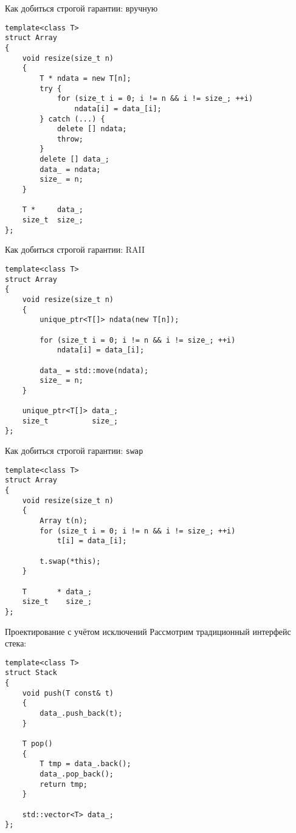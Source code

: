 \documentclass{beamer}
\begin{document}
\begin{frame}[fragile]{Как добиться строгой гарантии: вручную}
    \begin{lstlisting}
template<class T> 
struct Array 
{
    void resize(size_t n) 
    {
        T * ndata = new T[n];
        try { 
            for (size_t i = 0; i != n && i != size_; ++i)
                ndata[i] = data_[i];
        } catch (...) { 
            delete [] ndata;
            throw;
        }
        delete [] data_;
        data_ = ndata;
        size_ = n;    
    }
    
    T *     data_;
    size_t  size_;
};
    \end{lstlisting}
\end{frame}

\begin{frame}[fragile]{Как добиться строгой гарантии: RAII}
\begin{lstlisting}
template<class T>
struct Array 
{
    void resize(size_t n) 
    {
        unique_ptr<T[]> ndata(new T[n]);

        for (size_t i = 0; i != n && i != size_; ++i)
            ndata[i] = data_[i];

        data_ = std::move(ndata);
        size_ = n;    
    }

    unique_ptr<T[]> data_;
    size_t          size_;
};
\end{lstlisting}
\end{frame}

\begin{frame}[fragile]{Как добиться строгой гарантии: \texttt{swap}}
\begin{lstlisting}
template<class T>
struct Array 
{
    void resize(size_t n) 
    {
        Array t(n);
        for (size_t i = 0; i != n && i != size_; ++i)
            t[i] = data_[i];

        t.swap(*this);
    }

    T       * data_;
    size_t    size_;
};
\end{lstlisting}
\end{frame}


\begin{frame}[fragile]{Проектирование с учётом исключений}
    Рассмотрим традиционный интерфейс стека:
\begin{lstlisting}
template<class T> 
struct Stack 
{
    void push(T const& t) 
    { 
        data_.push_back(t); 
    }

    T pop() 
    {
        T tmp = data_.back();
        data_.pop_back();
        return tmp;
    }

    std::vector<T> data_;
};
\end{lstlisting}
\end{frame}
\end{document}
